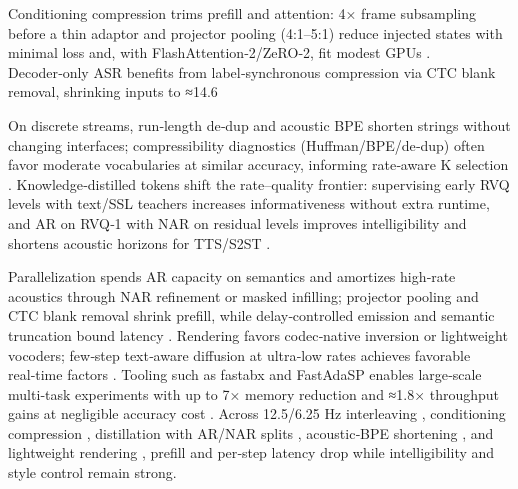 \documentclass{article}
\begin{document}
Conditioning compression trims prefill and attention: 4× frame subsampling before a thin adaptor and projector pooling (4:1–5:1) reduce injected states with minimal loss and, with FlashAttention‑2/ZeRO‑2, fit modest GPUs \cite{wang2023slmbridgethingapbetweenspeechtextfoundat,nguyen2025qwenvsgemmaintegrationwhispercomparative}. Decoder‑only ASR benefits from label‑synchronous compression via CTC blank removal, shrinking inputs to ≈14.6%

On discrete streams, run‑length de‑dup and acoustic BPE shorten strings without changing interfaces; compressibility diagnostics (Huffman/BPE/de‑dup) often favor moderate vocabularies at similar accuracy, informing rate‑aware K selection \cite{vashishth2024stabspeechtokenizerassessmentbenchmark}. Knowledge‑distilled tokens shift the rate–quality frontier: supervising early RVQ levels with text/SSL teachers increases informativeness without extra runtime, and AR on RVQ‑1 with NAR on residual levels improves intelligibility and shortens acoustic horizons for TTS/S2ST \cite{ahasan2025dmcodecdistillingmultimodalrepresentatio,peng2024mslms2stmultitaskspeechlanguagemodeltext}.

Parallelization spends AR capacity on semantics and amortizes high‑rate acoustics through NAR refinement or masked infilling; projector pooling and CTC blank removal shrink prefill, while delay‑controlled emission and semantic truncation bound latency \cite{guo2025streamuniachievingstreamingspeechtransla}. Rendering favors codec‑native inversion or lightweight vocoders; few‑step text‑aware diffusion at ultra‑low rates achieves favorable real‑time factors \cite{wang2025tadicodectextawarediffusionspeechtokeniz}. Tooling such as fastabx and FastAdaSP enables large‑scale multi‑task experiments with up to 7× memory reduction and ≈1.8× throughput gains at negligible accuracy cost \cite{poli2025fastabxlibraryefficientcomputationabxdis,lu2024fastadaspmultitaskadaptedefficientinfere}. Across 12.5/6.25 Hz interleaving \cite{zeng2024scalingspeechtextpretrainingsyntheticint}, conditioning compression \cite{wang2023slmbridgethingapbetweenspeechtextfoundat,nguyen2025qwenvsgemmaintegrationwhispercomparative,tsunoo2024decoderonlyarchitecturespeechrecognition}, distillation with AR/NAR splits \cite{ahasan2025dmcodecdistillingmultimodalrepresentatio,peng2024mslms2stmultitaskspeechlanguagemodeltext}, acoustic‑BPE shortening \cite{vashishth2024stabspeechtokenizerassessmentbenchmark}, and lightweight rendering \cite{wang2025tadicodectextawarediffusionspeechtokeniz}, prefill and per‑step latency drop while intelligibility and style control remain strong.
\end{document}

